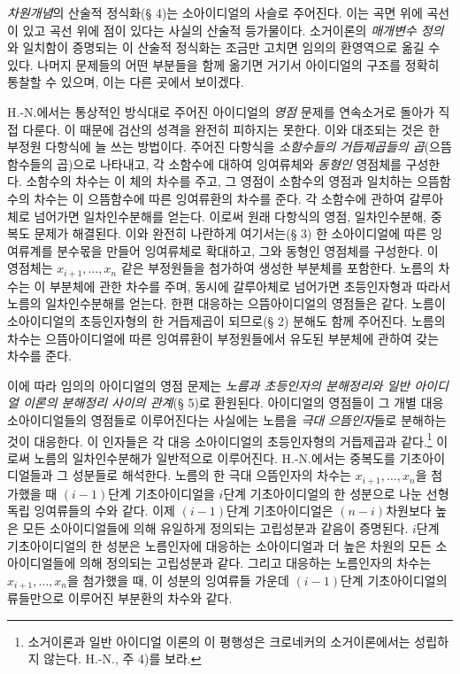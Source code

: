 \emph{차원개념}의 산술적 정식화(§ 4)는 소아이디얼의 사슬로 주어진다. 이는 곡면 위에 곡선이 있고 곡선 위에 점이 있다는 사실의 산술적 등가물이다. 소거이론의 \emph{매개변수 정의}와 일치함이 증명되는 이 산술적 정식화는 조금만 고치면 임의의 환영역으로 옮길 수 있다. 나머지 문제들의 어떤 부분들을 함께 옮기면 거기서 아이디얼의 구조를 정확히 통찰할 수 있으며, 이는 다른 곳에서 보이겠다.

H.-N.에서는 통상적인 방식대로 주어진 아이디얼의 \emph{영점} 문제를 연속소거로 돌아가 직접 다룬다. 이 때문에 검산의 성격을 완전히 피하지는 못한다. 이와 대조되는 것은 한 부정원 다항식에 늘 쓰는 방법이다. 주어진 다항식을 \emph{소함수들의 거듭제곱들의 곱}(으뜸함수들의 곱)으로 나타내고, 각 소함수에 대하여 잉여류체와 \emph{동형인} 영점체를 구성한다. 소함수의 차수는 이 체의 차수를 주고, 그 영점이 소함수의 영점과 일치하는 으뜸함수의 차수는 이 으뜸함수에 따른 잉여류환의 차수를 준다. 각 소함수에 관하여 갈루아체로 넘어가면 일차인수분해를 얻는다. 이로써 원래 다항식의 영점, 일차인수분해, 중복도 문제가 해결된다. 이와 완전히 나란하게 여기서는(§ 3) 한 소아이디얼에 따른 잉여류계를 분수몫을 만들어 잉여류체로 확대하고, 그와 동형인 영점체를 구성한다. 이 영점체는 \(x_{i+1},\ldots,x_n\) 같은 부정원들을 첨가하여 생성한 부분체를 포함한다. 노름의 차수는 이 부분체에 관한 차수를 주며, 동시에 갈루아체로 넘어가면 초등인자형과 따라서 노름의 일차인수분해를 얻는다. 한편 대응하는 으뜸아이디얼의 영점들은 같다. 노름이 소아이디얼의 초등인자형의 한 거듭제곱이 되므로(§ 2) 분해도 함께 주어진다. 노름의 차수는 으뜸아이디얼에 따른 잉여류환이 부정원들에서 유도된 부분체에 관하여 갖는 차수를 준다.

이에 따라 임의의 아이디얼의 영점 문제는 \emph{노름과 초등인자의 분해정리와 일반 아이디얼 이론의 분해정리 사이의 관계}(§ 5)로 환원된다. 아이디얼의 영점들이 그 개별 대응 소아이디얼들의 영점들로 이루어진다는 사실에는 노름을 \emph{극대 으뜸인자}들로 분해하는 것이 대응한다. 이 인자들은 각 대응 소아이디얼의 초등인자형의 거듭제곱과 같다.\footnote{소거이론과 일반 아이디얼 이론의 이 평행성은 크로네커의 소거이론에서는 성립하지 않는다. H.-N., 주 4)를 보라.} 이로써 노름의 일차인수분해가 일반적으로 이루어진다. H.-N.에서는 중복도를 기초아이디얼들과 그 성분들로 해석한다. 노름의 한 극대 으뜸인자의 차수는 \(x_{i+1},\ldots,x_n\)을 첨가했을 때 \((i-1)\)단계 기초아이디얼을 \(i\)단계 기초아이디얼의 한 성분으로 나눈 선형독립 잉여류들의 수와 같다. 이제 \((i-1)\)단계 기초아이디얼은 \((n-i)\)차원보다 높은 모든 소아이디얼들에 의해 유일하게 정의되는 고립성분과 같음이 증명된다. \(i\)단계 기초아이디얼의 한 성분은 노름인자에 대응하는 소아이디얼과 더 높은 차원의 모든 소아이디얼들에 의해 정의되는 고립성분과 같다. 그리고 대응하는 노름인자의 차수는 \(x_{i+1},\ldots,x_n\)을 첨가했을 때, 이 성분의 잉여류들 가운데 \((i-1)\)단계 기초아이디얼의 류들만으로 이루어진 부분환의 차수와 같다.


